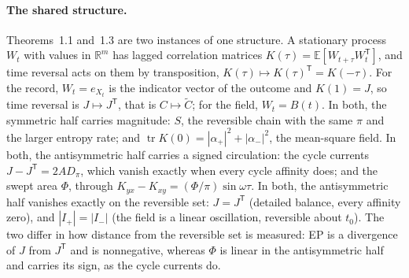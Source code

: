 \documentclass[11pt]{article}
\theoremstyle{definition}\newtheorem{definition}[theorem]{Definition}
\theoremstyle{remark}\newtheorem{remark}[theorem]{Remark}
\newcommand{\R}{\mathbb R}\newcommand{\C}{\mathbb C}\newcommand{\N}{\mathbb N}
\begin{document}
\paragraph{The shared structure.} Theorems~1.1 and~1.3 are two instances of one structure. A stationary process $W_t$ with values in $\R^m$ has lagged correlation matrices $K(\tau)=\mathbb E[W_{t+\tau}W_t^{\mathsf T}]$, and time reversal acts on them by transposition, $K(\tau)\mapsto K(\tau)^{\mathsf T}=K(-\tau)$. For the record, $W_t=e_{X_t}$ is the indicator vector of the outcome and $K(1)=J$, so time reversal is $J\mapsto J^{\mathsf T}$, that is $C\mapsto\tilde C$; for the field, $W_t=B(t)$. In both, the symmetric half carries magnitude: $S$, the reversible chain with the same $\pi$ and the larger entropy rate; and $\operatorname{tr}K(0)=|\alpha_+|^2+|\alpha_-|^2$, the mean-square field. In both, the antisymmetric half carries a signed circulation: the cycle currents $J-J^{\mathsf T}=2AD_\pi$, which vanish exactly when every cycle affinity does; and the swept area $\Phi$, through $K_{yx}-K_{xy}=(\Phi/\pi)\sin\omega\tau$. In both, the antisymmetric half vanishes exactly on the reversible set: $J=J^{\mathsf T}$ (detailed balance, every affinity zero), and $|I_+|=|I_-|$ (the field is a linear oscillation, reversible about $t_0$). The two differ in how distance from the reversible set is measured: EP is a divergence of $J$ from $J^{\mathsf T}$ and is nonnegative, whereas $\Phi$ is linear in the antisymmetric half and carries its sign, as the cycle currents do.
\end{document}
